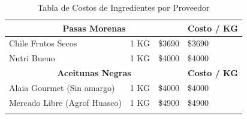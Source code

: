 \documentclass[12pt]{article}
\begin{document}
\begin{longtable}{|| m{4cm} | m{2.5cm} | m{3cm} | m{3cm} ||}
        \multicolumn{3}{||c|}{\textbf{Pasas Morenas}} & \textbf{Costo / KG} \\ [0.5ex] \hline \hline
        Chile Frutos Secos & 1 KG & \$\num{3690} & \$\num{3690} \\ \hline
        Nutri Bueno & 1 KG & \$\num{4000} & \$\num{4000} \\ [1ex] \hline \hline

        \multicolumn{3}{||c|}{\textbf{Aceitunas Negras}} & \textbf{Costo / KG} \\ [0.5ex] \hline \hline
        Alaia Gourmet (Sin amargo) & 1 KG & \$\num{4000} & \$\num{4000} \\ \hline
        Mercado Libre (Agrof Huasco) & 1 KG & \$\num{4900} & \$\num{4900} \\ [1ex] \hline \hline
    \caption{Tabla de Costos de Ingredientes por Proveedor}
    \label{tab:costos_ingredientes_proveedor}
    \end{longtable}
\newpage
\end{document}
